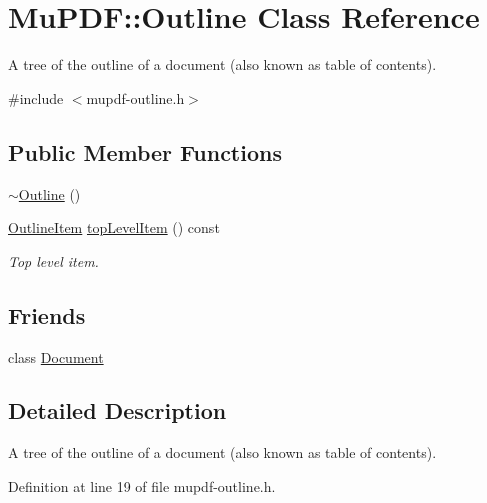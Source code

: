 \hypertarget{class_mu_p_d_f_1_1_outline}{\section{Mu\-P\-D\-F\-:\-:Outline Class Reference}
\label{class_mu_p_d_f_1_1_outline}
}


A tree of the outline of a document (also known as table of contents).  




{\ttfamily \#include $<$mupdf-\/outline.\-h$>$}

\subsection*{Public Member Functions}
\begin{DoxyCompactItemize}
\item 
\hyperlink{class_mu_p_d_f_1_1_outline_a595999d446d98a2dcabf0b208fad0038}{$\sim$\-Outline} ()
\item 
\hyperlink{class_mu_p_d_f_1_1_outline_item}{Outline\-Item} \hyperlink{class_mu_p_d_f_1_1_outline_a5cb3d15517c68bed0486cd7a2a06c5db}{top\-Level\-Item} () const 
\begin{DoxyCompactList}\small\item\em Top level item. \end{DoxyCompactList}\end{DoxyCompactItemize}
\subsection*{Friends}
\begin{DoxyCompactItemize}
\item 
class \hyperlink{class_mu_p_d_f_1_1_outline_a883538034e58fc5c0de7d4e4cab3cef7}{Document}
\end{DoxyCompactItemize}


\subsection{Detailed Description}
A tree of the outline of a document (also known as table of contents). 

Definition at line 19 of file mupdf-\/outline.\-h.



